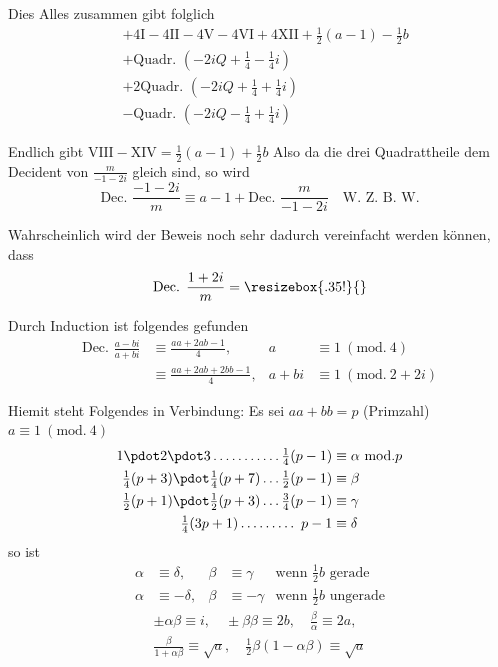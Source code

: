 Dies Alles zusammen gibt folglich
\[
\begin{aligned}
&+4\mathrm{I}-4\mathrm{II}-4\mathrm{V}-4\mathrm{VI}+4\mathrm{XII}+\tfrac12(a-1)-\tfrac12b\\
&+\text{Quadr. }(-2iQ+\tfrac14-\tfrac14i)\\
&+2\text{Quadr. }(-2iQ+\tfrac14+\tfrac14i)\\
&-\text{Quadr. }(-2iQ-\tfrac14+\tfrac14i)
\end{aligned}
\]

Endlich gibt $\mathrm{VIII}-\mathrm{XIV}=\frac12(a-1)+\frac12b$
Also da die drei Quadrattheile dem Decident von $\frac{m}{-1-2i}$ gleich sind, so wird
\[
\text{Dec. }\frac{-1-2i}{m}\equiv a-1+\text{Dec. }\frac{m}{-1-2i}\quad\text{W. Z. B. W.}
\]

Wahrscheinlich wird der Beweis noch sehr dadurch vereinfacht werden können, dass
\[
\text{Dec. }\frac{1+2i}{m}=\vcenter{\hbox{\resizebox{.35\textwidth}{!}{}}}
\]


Durch Induction ist folgendes gefunden
\[
\begin{aligned}
\text{Dec. }\frac{a-bi}{a+bi}&\equiv\frac{aa+2ab-1}{4},& a&\equiv1\ (\mathrm{mod.}\ 4)\\
&\equiv\frac{aa+2ab+2bb-1}{4},&a+bi&\equiv1\ (\mathrm{mod.}\ 2+2i)
\end{aligned}
\]

Hiemit steht Folgendes in Verbindung:
Es sei $aa+bb=p$ (Primzahl) $a\equiv1\ (\mathrm{mod.}\ 4)$
\[
\begin{aligned}
1\pdot2\pdot3\mathinner{.\,.\,.\,.\,.\,.\,.\,.\,.\,.\,.}\tfrac14(p-1)&\equiv\alpha\ \mathrm{mod.}p\\
\tfrac14(p+3)\pdot\tfrac14(p+7)\ldots\tfrac12(p-1)&\equiv\beta\\
\tfrac12(p+1)\pdot\tfrac12(p+3)\ldots\tfrac34(p-1)&\equiv\gamma\\
\tfrac14(3p+1)\mathinner{.\,.\,.\,.\,.\,.\,.\,.\,.}\ p-1&\equiv\delta
\end{aligned}
\]
so ist
\[
\begin{aligned}
\alpha&\equiv\delta,&\beta&\equiv\gamma&\text{wenn }\tfrac12b\text{ gerade}\\
\alpha&\equiv-\delta,&\beta&\equiv-\gamma&\text{wenn }\tfrac12b\text{ ungerade}
\end{aligned}
\]
\[
\begin{gathered}
\pm\alpha\beta\equiv i,\quad\pm\beta\beta\equiv2b,\quad\frac\beta\alpha\equiv2a,\\
\frac\beta{1+\alpha\beta}\equiv\surd a,\quad\tfrac12\beta(1-\alpha\beta)\equiv\surd a
\end{gathered}
\]

